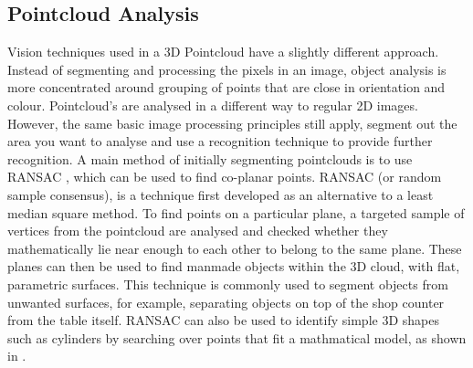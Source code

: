 \subsection{Pointcloud Analysis}
Vision techniques used in a 3D Pointcloud have a slightly different approach. Instead of segmenting and processing the pixels in an image, object analysis is more concentrated around grouping of points that are close in orientation and colour.\newline\newline
Pointcloud's are analysed in a different way to regular 2D images. However, the same basic image processing principles still apply, segment out the area you want to analyse and use a recognition technique to provide further recognition. A main method of initially segmenting pointclouds is to use RANSAC \cite{ransac}, which can be used to find co-planar points. RANSAC (or random sample consensus), is a technique first developed as an alternative to a least median square method. To find points on a particular plane, a targeted sample of vertices from the pointcloud are analysed and checked whether they mathematically lie near enough to each other to belong to the same plane. These planes can then be used to find manmade objects within the 3D cloud, with flat, parametric surfaces. This technique is commonly used to segment objects from unwanted surfaces, for example, separating objects on top of the shop counter from the table itself. RANSAC can also be used to identify simple 3D shapes such as cylinders by searching over points that fit a mathmatical model, as shown in \textbf{}.
